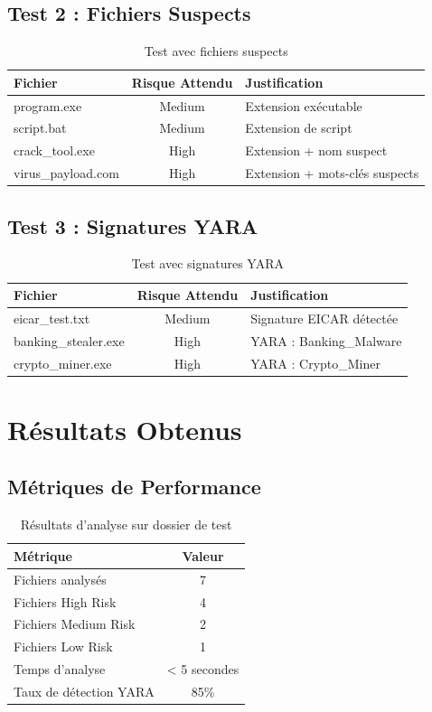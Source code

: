 \documentclass[12pt,a4paper]{report}
\begin{document}
\subsection{Test 2 : Fichiers Suspects}

\begin{table}[h]
\centering
\begin{tabular}{|l|c|l|}
\hline
\textbf{Fichier} & \textbf{Risque Attendu} & \textbf{Justification} \\
\hline
program.exe & Medium & Extension exécutable \\
script.bat & Medium & Extension de script \\
crack\_tool.exe & High & Extension + nom suspect \\
virus\_payload.com & High & Extension + mots-clés suspects \\
\hline
\end{tabular}
\caption{Test avec fichiers suspects}
\end{table}

\subsection{Test 3 : Signatures YARA}

\begin{table}[h]
\centering
\begin{tabular}{|l|c|l|}
\hline
\textbf{Fichier} & \textbf{Risque Attendu} & \textbf{Justification} \\
\hline
eicar\_test.txt & Medium & Signature EICAR détectée \\
banking\_stealer.exe & High & YARA : Banking\_Malware \\
crypto\_miner.exe & High & YARA : Crypto\_Miner \\
\hline
\end{tabular}
\caption{Test avec signatures YARA}
\end{table}

\section{Résultats Obtenus}

\subsection{Métriques de Performance}

\begin{table}[h]
\centering
\begin{tabular}{|l|c|}
\hline
\textbf{Métrique} & \textbf{Valeur} \\
\hline
Fichiers analysés & 7 \\
Fichiers High Risk & 4 \\
Fichiers Medium Risk & 2 \\
Fichiers Low Risk & 1 \\
Temps d'analyse & < 5 secondes \\
Taux de détection YARA & 85\% \\
\hline
\end{tabular}
\caption{Résultats d'analyse sur dossier de test}
\end{table}
\end{document}
